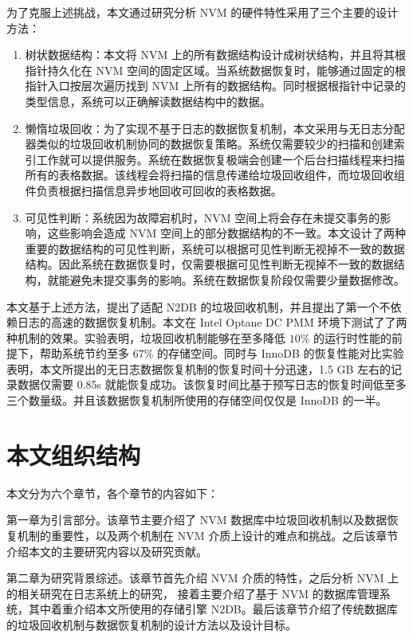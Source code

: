 为了克服上述挑战，本文通过研究分析 NVM 的硬件特性采用了三个主要的设计方法：

\begin{enumerate}
    \item 树状数据结构：本文将 NVM 上的所有数据结构设计成树状结构，并且将其根指针持久化在 NVM 空间的固定区域。当系统数据恢复时，能够通过固定的根指针入口按层次遍历找到 NVM 上所有的数据结构。同时根据根指针中记录的类型信息，系统可以正确解读数据结构中的数据。
    \item 懒惰垃圾回收：为了实现不基于日志的数据恢复机制，本文采用与无日志分配器类似的垃圾回收机制协同的数据恢复策略。系统仅需要较少的扫描和创建索引工作就可以提供服务。系统在数据恢复极端会创建一个后台扫描线程来扫描所有的表格数据。该线程会将扫描的信息传递给垃圾回收组件，而垃圾回收组件负责根据扫描信息异步地回收可回收的表格数据。
    \item 可见性判断：系统因为故障宕机时，NVM 空间上将会存在未提交事务的影响，这些影响会造成 NVM 空间上的部分数据结构的不一致。本文设计了两种重要的数据结构的可见性判断，系统可以根据可见性判断无视掉不一致的数据结构。因此系统在数据恢复时，仅需要根据可见性判断无视掉不一致的数据结构，就能避免未提交事务的影响。系统在数据恢复阶段仅需要少量数据修改。
\end{enumerate}

本文基于上述方法，提出了适配 N2DB 的垃圾回收机制，并且提出了第一个不依赖日志的高速的数据恢复机制。本文在 Intel Optane DC PMM 环境下测试了了两种机制的效果。实验表明，垃圾回收机制能够在至多降低 $10\%$ 的运行时性能的前提下，帮助系统节约至多 $67\%$ 的存储空间。同时与 InnoDB 的恢复性能对比实验表明，本文所提出的无日志数据恢复机制的恢复时间十分迅速，1.5 GB 左右的记录数据仅需要 0.85s 就能恢复成功。该恢复时间比基于预写日志的恢复时间低至多三个数量级。并且该数据恢复机制所使用的存储空间仅仅是 InnoDB 的一半。

\section{本文组织结构}

本文分为六个章节，各个章节的内容如下：

第一章为引言部分。该章节主要介绍了 NVM 数据库中垃圾回收机制以及数据恢复机制的重要性，以及两个机制在 NVM 介质上设计的难点和挑战。之后该章节介绍本文的主要研究内容以及研究贡献。

第二章为研究背景综述。该章节首先介绍 NVM 介质的特性，之后分析 NVM 上的相关研究在日志系统上的研究，
接着主要介绍了基于 NVM 的数据库管理系统，其中着重介绍本文所使用的存储引擎 N2DB。最后该章节介绍了传统数据库的垃圾回收机制与数据恢复机制的设计方法以及设计目标。

